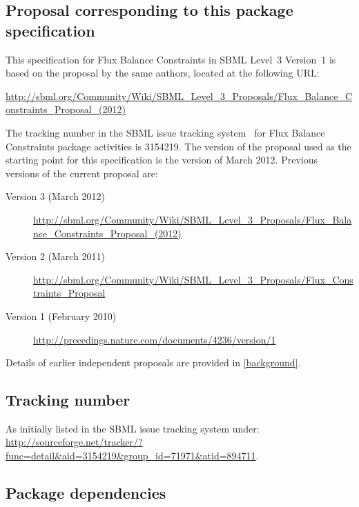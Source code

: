 \subsection{Proposal corresponding to this package specification}

This specification for Flux Balance Constraints in SBML Level~3
Version~1 is based on the proposal by the same authors, located at the
following URL:

\begin{center}
  \vspace*{1ex}\small
  \url{http://sbml.org/Community/Wiki/SBML_Level_3_Proposals/Flux_Balance_Constraints_Proposal_(2012)}
  \vspace*{1ex}
\end{center}

The tracking number in the SBML issue tracking system~\citep{tracker}
for Flux Balance Constraints package activities is 3154219.  The
version of the proposal used as the starting point for this
specification is the version of March 2012. Previous versions of the current proposal are:
\begin{description}
  \item[Version 3 (March 2012)]
  \item [] \small{\url{http://sbml.org/Community/Wiki/SBML_Level_3_Proposals/Flux_Balance_Constraints_Proposal_(2012)}}
  \item[Version 2 (March 2011)]
  \item [] \small{\url{http://sbml.org/Community/Wiki/SBML_Level_3_Proposals/Flux_Constraints_Proposal}}
  \item[Version 1 (February 2010)]
  \item [] \small{\url{http://precedings.nature.com/documents/4236/version/1}}
\end{description}
Details of earlier independent proposals are provided in \ref{background}.

\subsection{Tracking number}
As initially listed in the SBML issue tracking system under: \url{http://sourceforge.net/tracker/?func=detail&aid=3154219&group_id=71971&atid=894711}.

\subsection{Package dependencies}

